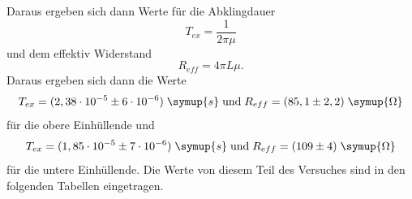   Daraus ergeben sich dann Werte für die Abklingdauer
  \begin{equation*}
    T_{ex} = \frac{1}{2\pi\mu}
  \end{equation*}
  und dem effektiv Widerstand
  \begin{equation*}
    R_{eff} = 4\pi L \mu.
  \end{equation*}
Daraus ergeben sich dann die Werte
\begin{equation*}
  T_{ex}=(2,38\cdot 10^{-5} \pm 6\cdot 10 ^{-6})\; \symup{s} \; \text{und} \;
  R_{eff} = (85,1 \pm 2,2) \;\symup{\Omega}
\end{equation*}
für die obere Einhüllende und
\begin{equation*}
  T_{ex}=(1,85\cdot 10^{-5} \pm 7\cdot 10 ^{-6})\; \symup{s} \; \text{und} \;
  R_{eff} = (109 \pm 4) \;\symup{\Omega}
\end{equation*}
für die untere Einhüllende. Die Werte von diesem Teil des Versuches sind in den
folgenden Tabellen eingetragen.
